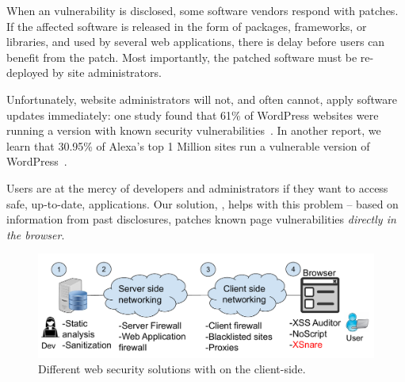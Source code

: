 When an \xss vulnerability is disclosed, some software vendors respond
with patches. If the affected software is released in the form of
packages, frameworks, or libraries, and used by several web
applications, there is delay before users can benefit from the
patch. Most importantly, the patched software must be re-deployed by
site administrators.

Unfortunately, website administrators will not, and often cannot,
apply software updates immediately: one study found
that 61\% of WordPress websites were running a version with known
security vulnerabilities~\cite{Sucuri}. In another report, we learn
that 30.95\% of Alexa's top 1 Million sites run a vulnerable version
of WordPress~\cite{wpwhitesecurity}.

Users are at the mercy of developers and administrators if
they want to access safe, up-to-date, applications. Our solution, \textbf{\sys},
helps with this problem -- based on information from past disclosures,
\sys patches known page vulnerabilities \emph{directly in the browser}.

\begin{figure}[h]
  \includegraphics[scale=0.37]{img/web_app_architecture.pdf}
  \vspace*{-5.0ex}
  \caption{Different web security solutions with \sys on the client-side.}
  \label{fig:web_architecture}
\end{figure}

